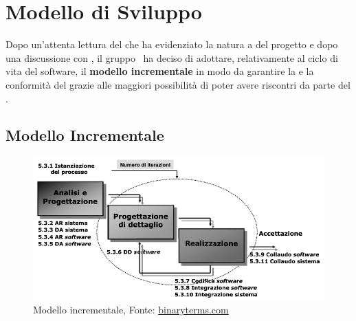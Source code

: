 \section{Modello di Sviluppo}
\label{modello_di_sviluppo}
Dopo un'attenta lettura del  che ha evidenziato la natura a  del progetto e dopo una discussione con \Proponente, il gruppo \Gruppo\ ha deciso di adottare, relativamente al ciclo di vita del software, il \textbf{modello incrementale} in modo da garantire la  e la conformità del  grazie alle maggiori possibilità di poter avere riscontri da parte del . 

\subsection{Modello Incrementale}

\begin{figure}[ht]
    \centering
    \includegraphics[width=\textwidth]{Immagini/ModelloIncrementale}
    \caption{Modello incrementale, Fonte: \href{https://binaryterms.com/incremental-development-model.html}{binaryterms.com}}
    \label{fig:modello_incrementale}
\end{figure}


